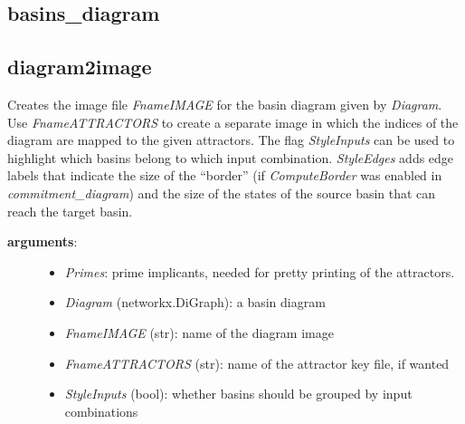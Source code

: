 \documentclass[letterpaper,10pt,english]{sphinxmanual}
\begin{document}
\subsection{basins\_diagram}
\label{AttractorBasins:id2}\label{AttractorBasins:basins-diagram}

\subsection{diagram2image}
\label{AttractorBasins:diagram2image}\label{AttractorBasins:id3}

\begin{fulllineitems}
\label{AttractorBasins:PyBoolNet.AttractorBasins.diagram2image}
Creates the image file \emph{FnameIMAGE} for the basin diagram given by \emph{Diagram}.
Use \emph{FnameATTRACTORS} to create a separate image in which the indices of the diagram are mapped to the given attractors.
The flag \emph{StyleInputs} can be used to highlight which basins belong to which input combination.
\emph{StyleEdges} adds edge labels that indicate the size of the ``border'' (if \emph{ComputeBorder} was enabled in \emph{commitment\_diagram})
and the size of the states of the source basin that can reach the target basin.
\begin{description}
\item[{\textbf{arguments}:}] \leavevmode\begin{itemize}
\item {} 
\emph{Primes}: prime implicants, needed for pretty printing of the attractors.

\item {} 
\emph{Diagram} (networkx.DiGraph): a basin diagram

\item {} 
\emph{FnameIMAGE} (str): name of the diagram image

\item {} 
\emph{FnameATTRACTORS} (str): name of the attractor key file, if wanted

\item {} 
\emph{StyleInputs} (bool): whether basins should be grouped by input combinations


\end{itemize}
\end{description}
\end{fulllineitems}
\end{document}
